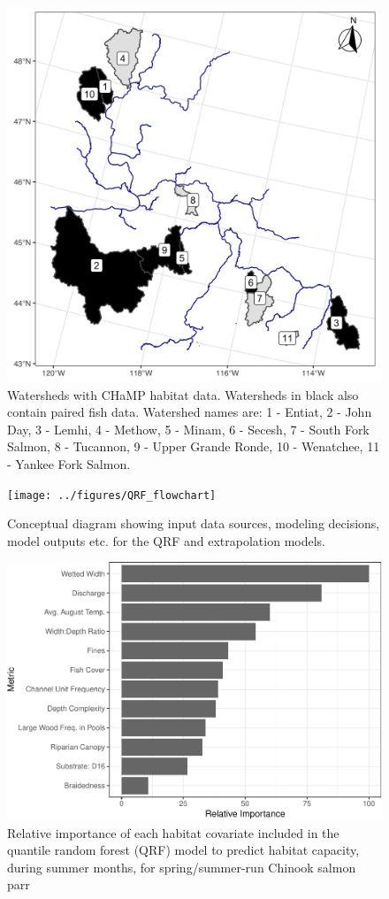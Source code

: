 \documentclass[
  12pt,
]{article}
\begin{document}
\hypertarget{figures}{}

\begin{figure}
\includegraphics[width=0.85\linewidth]{../figures/ChampWtds} \caption{Watersheds with CHaMP habitat data. Watersheds in black also contain paired fish data. Watershed names are: 1 - Entiat, 2 - John Day, 3 - Lemhi, 4 - Methow, 5 - Minam, 6 - Secesh, 7 - South Fork Salmon, 8 - Tucannon, 9 - Upper Grande Ronde, 10 - Wenatchee, 11 - Yankee Fork Salmon.}\label{fig:wtsd-map}
\end{figure}

\newpage

\begin{figure}
\texttt{[image: ../figures/QRF\_flowchart]} \caption{Conceptual diagram showing input data sources, modeling decisions, model outputs etc. for the QRF and extrapolation models.}\label{fig:model-diag}
\end{figure}

\newpage

\begin{figure}
\centering
\includegraphics{../figures/rel-imp-figure-1.pdf}
\caption{\label{fig:rel-imp-figure}Relative importance of each habitat covariate included in the quantile random forest (QRF) model to predict habitat capacity, during summer months, for spring/summer-run Chinook salmon parr}
\end{figure}
\end{document}
